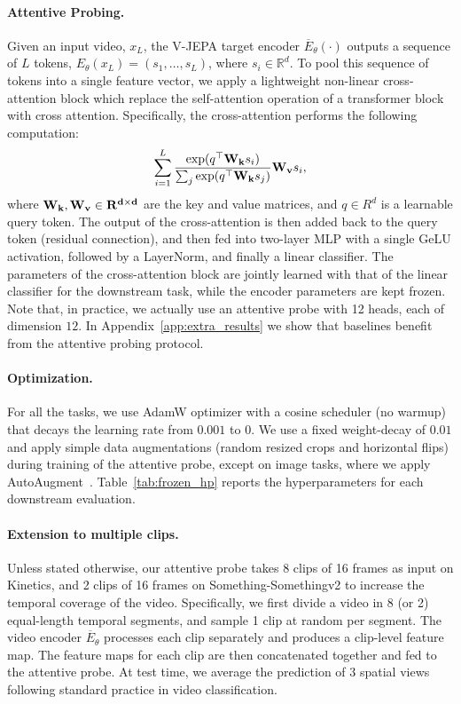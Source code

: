 \documentclass[twocolumn]{fairmeta}
\newcommand{\putalg}{{\small V-JEPA}\xspace}
\theoremstyle{plain}
\theoremstyle{definition}
\theoremstyle{remark}
\begin{document}
\paragraph{Attentive Probing.}
Given an input video, $x_L$, the \putalg target encoder $\overline{E}_{{\theta}}(\cdot)$ outputs a sequence of $L$ tokens, $E_{\theta}(x_L) = (s_1, \ldots, s_L)$, where $s_i \in \mathbb{R}^d$.
To pool this sequence of tokens into a single feature vector, we apply a lightweight non-linear cross-attention block which replace the self-attention operation of a transformer block with cross attention.
Specifically, the cross-attention performs the following computation:
\[
    \sum^L_{i=1}{\frac{\exp(q^\top {\bf W_k} s_i)}{\sum_j \exp(q^\top {\bf W_k} s_j)} {\bf W_v} s_i },
\]
where $\bf{W_k}, {\bf W_v} \in R^{d \times d}$ are the key and value matrices, and $q \in R^d$ is a learnable query token.
The output of the cross-attention is then added back to the query token (residual connection), and then fed into two-layer MLP with a single GeLU activation, followed by a LayerNorm, and finally a linear classifier.
The parameters of the cross-attention block are jointly learned with that of the linear classifier for the downstream task, while the encoder parameters are kept frozen.
Note that, in practice, we actually use an attentive probe with 12 heads, each of dimension $12$.
In Appendix~\ref{app:extra_results} we show that baselines benefit from the attentive probing protocol.

\paragraph{Optimization.}
For all the tasks, we use AdamW optimizer with a cosine scheduler (no warmup) that decays the learning rate from $0.001$ to $0$.
We use a fixed weight-decay of $0.01$ and apply simple data augmentations (random resized crops and horizontal flips) during training of the attentive probe, except on image tasks, where we apply AutoAugment~\citep{cubuk2019auto}.
Table~\ref{tab:frozen_hp} reports the hyperparameters for each downstream evaluation.

\paragraph{Extension to multiple clips.}
Unless stated otherwise, our attentive probe takes 8 clips of 16 frames as input on Kinetics, and 2 clips of 16 frames on Something-Somethingv2 to increase the temporal coverage of the video.
Specifically,  we first divide a video in 8 (or 2) equal-length temporal segments, and sample 1 clip at random per segment.
The video encoder $\overline{E}_{{\theta }}$ processes each clip separately and produces a clip-level feature map.
The feature maps for each clip are then concatenated together and fed to the attentive probe.
At test time, we average the prediction of 3 spatial views following standard practice in video classification.
\end{document}
